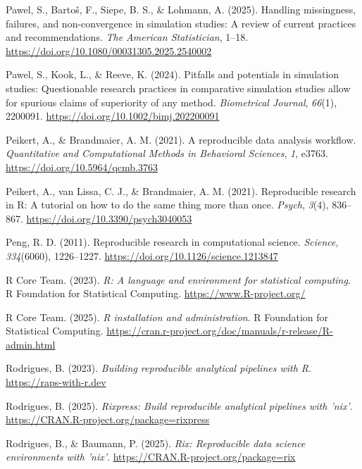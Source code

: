 \documentclass[
  man,
  longtable,
  nolmodern,
  notxfonts,
  notimes,
  colorlinks=true,linkcolor=blue,citecolor=blue,urlcolor=blue]{apa7}
\newlength{\cslhangindent}
\newenvironment{CSLReferences}[2] %
 {\begin{list}{}{%
  \setlength{\itemindent}{0pt}
  \setlength{\leftmargin}{0pt}
  \setlength{\parsep}{0pt}
  \ifodd #1
   \setlength{\leftmargin}{\cslhangindent}
   \setlength{\itemindent}{-1\cslhangindent}
  \fi
  \setlength{\itemsep}{#2\baselineskip}}}
 {\end{list}}
\begin{document}
\begin{CSLReferences}{1}{0}
Pawel, S., Bartoš, F., Siepe, B. S., \& Lohmann, A. (2025). Handling
missingness, failures, and non-convergence in simulation studies: A
review of current practices and recommendations. \emph{The American
Statistician}, 1--18.
\url{https://doi.org/10.1080/00031305.2025.2540002}

Pawel, S., Kook, L., \& Reeve, K. (2024). Pitfalls and potentials in
simulation studies: Questionable research practices in comparative
simulation studies allow for spurious claims of superiority of any
method. \emph{Biometrical Journal}, \emph{66}(1), 2200091.
\url{https://doi.org/10.1002/bimj.202200091}

Peikert, A., \& Brandmaier, A. M. (2021). A reproducible data analysis
workflow. \emph{Quantitative and Computational Methods in Behavioral
Sciences}, \emph{1}, e3763. \url{https://doi.org/10.5964/qcmb.3763}

Peikert, A., van Lissa, C. J., \& Brandmaier, A. M. (2021). Reproducible
research in {R}: A tutorial on how to do the same thing more than once.
\emph{Psych}, \emph{3}(4), 836--867.
\url{https://doi.org/10.3390/psych3040053}

Peng, R. D. (2011). Reproducible research in computational science.
\emph{Science}, \emph{334}(6060), 1226--1227.
\url{https://doi.org/10.1126/science.1213847}

R Core Team. (2023). \emph{R: A language and environment for statistical
computing}. R Foundation for Statistical Computing.
\url{https://www.R-project.org/}

R Core Team. (2025). \emph{R installation and administration}. R
Foundation for Statistical Computing.
\url{https://cran.r-project.org/doc/manuals/r-release/R-admin.html}

Rodrigues, B. (2023). \emph{Building reproducible analytical pipelines
with {R}}. \url{https://raps-with-r.dev}

Rodrigues, B. (2025). \emph{Rixpress: Build reproducible analytical
pipelines with 'nix'}. \url{https://CRAN.R-project.org/package=rixpress}

Rodrigues, B., \& Baumann, P. (2025). \emph{Rix: Reproducible data
science environments with 'nix'}.
\url{https://CRAN.R-project.org/package=rix}


\end{CSLReferences}
\end{document}

